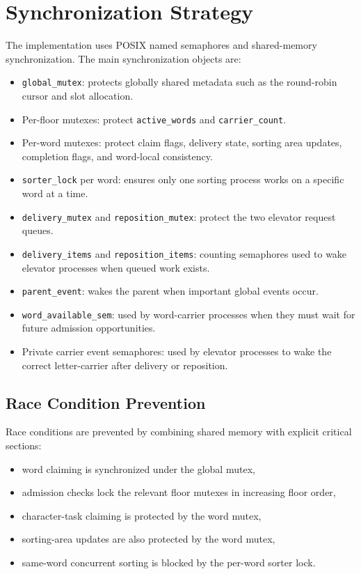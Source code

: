 \documentclass[12pt,a4paper]{article}
\begin{document}
\section{Synchronization Strategy}

The implementation uses POSIX named semaphores and shared-memory synchronization. The main synchronization objects are:

\begin{itemize}[leftmargin=1.5em]
\item \texttt{global\_mutex}: protects globally shared metadata such as the round-robin cursor and slot allocation.
\item Per-floor mutexes: protect \texttt{active\_words} and \texttt{carrier\_count}.
\item Per-word mutexes: protect claim flags, delivery state, sorting area updates, completion flags, and word-local consistency.
\item \texttt{sorter\_lock} per word: ensures only one sorting process works on a specific word at a time.
\item \texttt{delivery\_mutex} and \texttt{reposition\_mutex}: protect the two elevator request queues.
\item \texttt{delivery\_items} and \texttt{reposition\_items}: counting semaphores used to wake elevator processes when queued work exists.
\item \texttt{parent\_event}: wakes the parent when important global events occur.
\item \texttt{word\_available\_sem}: used by word-carrier processes when they must wait for future admission opportunities.
\item Private carrier event semaphores: used by elevator processes to wake the correct letter-carrier after delivery or reposition.
\end{itemize}

\subsection{Race Condition Prevention}

Race conditions are prevented by combining shared memory with explicit critical sections:

\begin{itemize}[leftmargin=1.5em]
\item word claiming is synchronized under the global mutex,
\item admission checks lock the relevant floor mutexes in increasing floor order,
\item character-task claiming is protected by the word mutex,
\item sorting-area updates are also protected by the word mutex,
\item same-word concurrent sorting is blocked by the per-word sorter lock.
\end{itemize}
\end{document}

